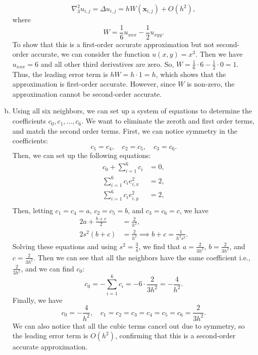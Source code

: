 \documentclass{article}
\renewcommand{\vec}[1]{\mathbf{#1}}
\newcommand{\vx}{\vec{x}}
\begin{document}
\begin{enumerate}[(a)]
  \begin{equation*}
    \nabla^2_3 u_{i,j} = \Delta u_{i,j} = h W(\vx_{i,j}) + O(h^2),
  \end{equation*}
  where
  \begin{equation*}
    W = \frac{1}{6} u_{xxx} - \frac{1}{2} u_{xyy}.
  \end{equation*} %
  To show that this is a first-order accurate approximation but not second-order accurate, we can consider the function $u(x,y) = x^3$. Then we have $u_{xxx} = 6$ and all other third derivatives are zero. So, $W = \frac{1}{6} \cdot 6 - \frac{1}{2} \cdot 0 = 1$. Thus, the leading error term is $h W = h \cdot 1 = h$, which shows that the approximation is first-order accurate. However, since $W$ is non-zero, the approximation cannot be second-order accurate.
  \item Using all six neighbors, we can set up a system of equations to determine the coefficients $c_0, c_1, \ldots, c_6$. We want to eliminate the zeroth and first order terms, and match the second order terms. First, we can notice symmetry in the coefficients:
  \begin{equation*}
    c_1 = c_4, \quad c_2 = c_5, \quad c_3 = c_6.
  \end{equation*}
  Then, we can set up the following equations:
  \begin{align*}
    c_0 + \sum_{i=1}^6 c_i & = 0, \\
    \sum_{i=1}^6 c_i e^2_{i,x} & = 2, \\
    \sum_{i=1}^6 c_i e^2_{i,y} & = 2, \\
  \end{align*}
  Then, letting $c_1 = c_4 = a$, $c_2 = c_5 = b$, and $c_3 = c_6 = c$, we have
  \begin{align*}
    2a + \frac{b + c}{2} &= \frac{2}{h^2}, \\
    2s^2(b + c) &= \frac{2}{h^2} \implies b + c = \frac{1}{h^2 s^2}.
  \end{align*}
  Solving these equations and using $s^2 = \frac{3}{4}$, we find that $a = \frac{2}{3h^2}$, $b = \frac{2}{3h^2}$, and $c = \frac{2}{3h^2}$. Then we can see that all the neighbors have the same coefficient i.e., $\frac{2}{3h^2}$, and we can find $c_0$:
  \begin{equation*}
    c_0 = -\sum_{i=1}^6 c_i = -6 \cdot \frac{2}{3h^2} = -\frac{4}{h^2}.
  \end{equation*}
  Finally, we have 
  \[
    c_0 = -\frac{4}{h^2}, \quad c_1 = c_2 = c_3 = c_4 = c_5 = c_6 = \frac{2}{3h^2}.
  \]
  We can also notice that all the cubic terms cancel out due to symmetry, so the leading error term is $O(h^2)$, confirming that this is a second-order accurate approximation.





\end{enumerate}
\end{document}
